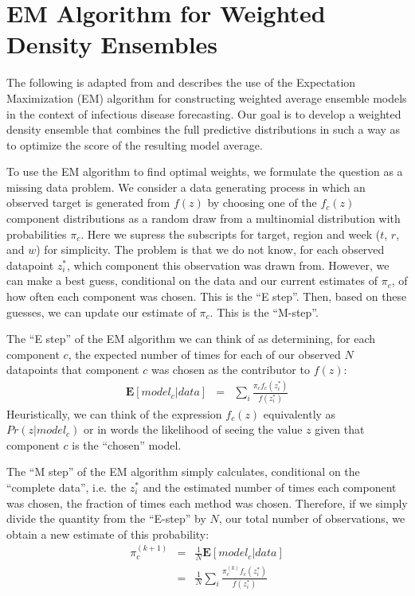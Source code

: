 \documentclass{article}\usepackage[]{graphicx}\usepackage[]{color}
\begin{document}
\clearpage


\section{EM Algorithm for Weighted Density Ensembles}

The following is adapted from \cite{Rosenfeld1997,Rosenfeld2007} and describes the use of the Expectation Maximization (EM) algorithm for constructing weighted average ensemble models in the context of infectious disease forecasting.  
Our goal is to develop a weighted density ensemble that combines the full predictive distributions in such a way as to optimize the score of the resulting model average.


To use the EM algorithm to find optimal weights, we formulate the question as a missing data problem. 
We consider a data generating process in which an observed target is generated from $f(z)$ by choosing one of the $f_c(z)$ component distributions as a random draw from a multinomial distribution with probabilities $\pi_c$. 
Here we supress the subscripts for target, region and week ($t$, $r$, and $w$) for simplicity.
The problem is that we do not know, for each observed datapoint $z_i^*$, which component this observation was drawn from. 
However, we can make a best guess, conditional on the data and our current estimates of $\pi_c$, of how often each component was chosen. 
This is the ``E step''. Then, based on these guesses, we can update our estimate of $\pi_c$. This is the ``M-step''.

The ``E step'' of the EM algorithm we can think of as determining, for each component  $c$, the expected number of times for each of our observed $N$ datapoints that component $c$ was chosen as the contributor to $f(z)$:
\begin{eqnarray}
{\mathbf E}[ model_c |data ] %
 & = & \sum_i \frac{\pi_c f_c(z_i^*)}{f(z_i^*)} 
\end{eqnarray}
Heuristically, we can think of the expression $f_c(z)$ equivalently as $Pr(z| model_c)$ or in words the likelihood of seeing the value $z$ given that component $c$ is the ``chosen'' model. 

The ``M step'' of the EM algorithm simply calculates, conditional on the ``complete data'', i.e. the $z^*_i$ and the estimated number of times each component was chosen, the fraction of times each method was chosen. Therefore, if we simply divide the quantity from the ``E-step'' by $N$, our total number of observations, we obtain a new estimate of this probability: 
\begin{eqnarray}
\pi_c^{(k+1)} & = & \frac{1}{N} {\mathbf E}[ model_c |data ] \\
& = & \frac{1}{N} \sum_i \frac{\pi^{(k)}_c f_c(z_i^*)}{f(z_i^*)} 
\end{eqnarray}
\end{document}
